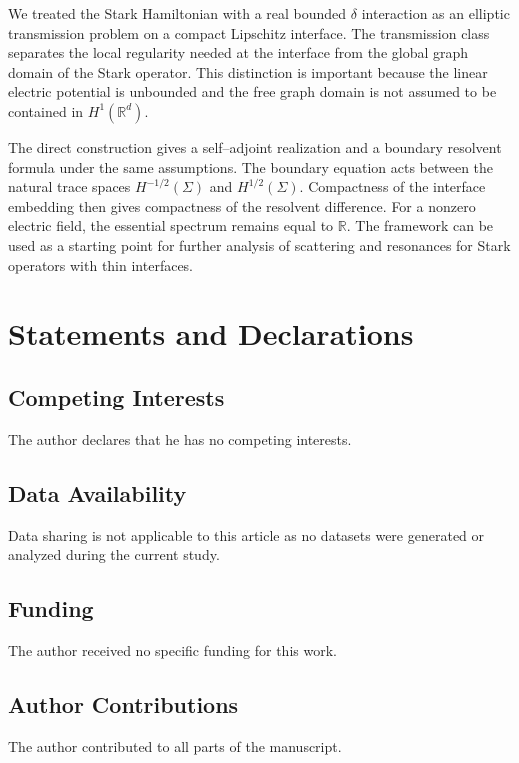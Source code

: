 \documentclass[a4paper,11pt]{article}
\numberwithin{equation}{section}
\theoremstyle{remark}
\theoremstyle{definition}
\theoremstyle{remark}
\begin{document}
We treated the Stark Hamiltonian with a real bounded $\delta$ interaction as an elliptic transmission problem on a compact Lipschitz interface.
The transmission class separates the local regularity needed at the interface from the global graph domain of the Stark operator.
This distinction is important because the linear electric potential is unbounded and the free graph domain is not assumed to be contained in $H^1(\mathbb R^d)$.

The direct construction gives a self--adjoint realization and a boundary resolvent formula under the same assumptions.
The boundary equation acts between the natural trace spaces $H^{-1/2}(\Sigma)$ and $H^{1/2}(\Sigma)$.
Compactness of the interface embedding then gives compactness of the resolvent difference.
For a nonzero electric field, the essential spectrum remains equal to $\mathbb R$.
The framework can be used as a starting point for further analysis of scattering and resonances for Stark operators with thin interfaces.

\section*{Statements and Declarations}

\subsection*{Competing Interests}
The author declares that he has no competing interests.

\subsection*{Data Availability}
Data sharing is not applicable to this article as no datasets were generated or analyzed during the current study.

\subsection*{Funding}
The author received no specific funding for this work.

\subsection*{Author Contributions}
The author contributed to all parts of the manuscript.
\end{document}
